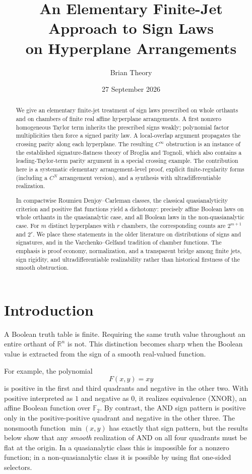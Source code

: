 \documentclass[11pt]{article}
\title{\vspace{-1.2cm}\textbf{An Elementary Finite-Jet Approach to Sign Laws\\on Hyperplane Arrangements}}
\author{Brian Theory}
\date{27 September 2026}
\theoremstyle{definition}
\theoremstyle{remark}
\newcommand{\R}{\mathbb{R}}
\newcommand{\Ftwo}{\mathbb{F}_2}
\begin{document}
\maketitle

\begin{abstract}
We give an elementary finite-jet treatment of sign laws prescribed on whole orthants and on chambers of finite real affine hyperplane arrangements. A first nonzero homogeneous Taylor term inherits the prescribed signs weakly; polynomial factor multiplicities then force a signed parity law. A local-overlap argument propagates the crossing parity along each hyperplane. The resulting $C^\infty$ obstruction is an instance of the established signature-flatness theory of Broglia and Tognoli, which also contains a leading-Taylor-term parity argument in a special crossing example. The contribution here is a systematic elementary arrangement-level proof, explicit finite-regularity forms (including a $C^N$ arrangement version), and a synthesis with ultradifferentiable realization.

In compactwise Roumieu Denjoy--Carleman classes, the classical quasianalyticity criterion and positive flat functions yield a dichotomy: precisely affine Boolean laws on whole orthants in the quasianalytic case, and all Boolean laws in the non-quasianalytic case. For $m$ distinct hyperplanes with $r$ chambers, the corresponding counts are $2^{m+1}$ and $2^r$. We place these statements in the older literature on distributions of signs and signatures, and in the Varchenko--Gelfand tradition of chamber functions. The emphasis is proof economy, normalization, and a transparent bridge among finite jets, sign rigidity, and ultradifferentiable realizability rather than historical firstness of the smooth obstruction.
\end{abstract}

\section{Introduction}

A Boolean truth table is finite. Requiring the same truth value throughout an entire orthant of $\R^n$ is not. This distinction becomes sharp when the Boolean value is extracted from the sign of a smooth real-valued function.

For example, the polynomial
\[
F(x,y)=xy
\]
is positive in the first and third quadrants and negative in the other two. With positive interpreted as $1$ and negative as $0$, it realizes equivalence (XNOR), an affine Boolean function over $\Ftwo$. By contrast, the AND sign pattern is positive only in the positive-positive quadrant and negative in the other three. The nonsmooth function $\min(x,y)$ has exactly that sign pattern, but the results below show that any \emph{smooth} realization of AND on all four quadrants must be flat at the origin. In a quasianalytic class this is impossible for a nonzero function; in a non-quasianalytic class it is possible by using flat one-sided selectors.
\end{document}
